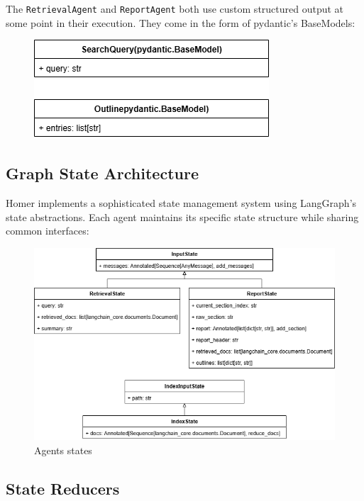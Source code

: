 \documentclass[11pt,a4paper]{report}
\begin{document}
The \texttt{RetrievalAgent} and \texttt{ReportAgent} both use custom structured output at some point in their execution. They come in the form of pydantic's BaseModels:

\begin{figure}[H]
    \centering
    \includegraphics[width=0.5\linewidth]{static/schemas/classDiagramStructuredOutputs.drawio.png}
    \label{fig:StructuredOutputs}
\end{figure}

\subsection{Graph State Architecture}

Homer implements a sophisticated state management system using LangGraph's state abstractions. Each agent maintains its specific state structure while sharing common interfaces:

\begin{figure}[H]
    \centering
    \includegraphics[width=\linewidth]{static/schemas/classDiagramStates.drawio.png}
    \caption{Agents states}
    \label{fig:states}
\end{figure}

\subsection{State Reducers}
\end{document}
